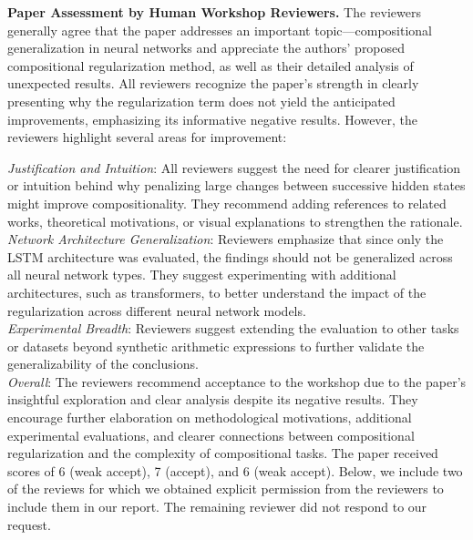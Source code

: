 \documentclass[11pt, a4paper]{include/gdm_format}
\begin{document}
\textbf{Paper Assessment by Human Workshop Reviewers.} The reviewers generally agree that the paper addresses an important topic—compositional generalization in neural networks and appreciate the authors' proposed compositional regularization method, as well as their detailed analysis of unexpected results. All reviewers recognize the paper's strength in clearly presenting why the regularization term does not yield the anticipated improvements, emphasizing its informative negative results. However, the reviewers highlight several areas for improvement:

\textit{Justification and Intuition}: All reviewers suggest the need for clearer justification or intuition behind why penalizing large changes between successive hidden states might improve compositionality. They recommend adding references to related works, theoretical motivations, or visual explanations to strengthen the rationale.\\
\textit{Network Architecture Generalization}: Reviewers emphasize that since only the LSTM architecture was evaluated, the findings should not be generalized across all neural network types. They suggest experimenting with additional architectures, such as transformers, to better understand the impact of the regularization across different neural network models.\\
\textit{Experimental Breadth}: Reviewers suggest extending the evaluation to other tasks or datasets beyond synthetic arithmetic expressions to further validate the generalizability of the conclusions.\\
\textit{Overall}: The reviewers recommend acceptance to the workshop due to the paper's insightful exploration and clear analysis despite its negative results. They encourage further elaboration on methodological motivations, additional experimental evaluations, and clearer connections between compositional regularization and the complexity of compositional tasks. The paper received scores of 6 (weak accept), 7 (accept), and 6 (weak accept). Below, we include two of the reviews for which we obtained explicit permission from the reviewers to include them in our report. The remaining reviewer did not respond to our request.

\begin{tcolorbox}[colback=green!5!white, colframe=green!75!black, breakable, title={\small Reviewer \#1: A good paper analyzing the effectiveness of a compositional regularization term for LSTMs}]
{\scriptsize }
\end{tcolorbox}
\end{document}
